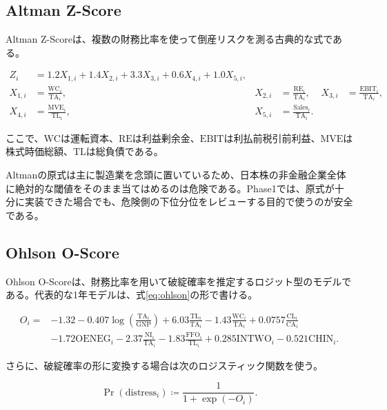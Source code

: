 \documentclass[11pt,a4paper]{article}
\newcommand{\NI}{\mathrm{NI}}
\newcommand{\TA}{\mathrm{TA}}
\newcommand{\TL}{\mathrm{TL}}
\newcommand{\WC}{\mathrm{WC}}
\newcommand{\RE}{\mathrm{RE}}
\newcommand{\MVE}{\mathrm{MVE}}
\begin{document}
\subsection{Altman Z-Score}

Altman Z-Scoreは、複数の財務比率を使って倒産リスクを測る古典的な式である。

\begin{align}
Z_i &= 1.2X_{1,i}+1.4X_{2,i}+3.3X_{3,i}+0.6X_{4,i}+1.0X_{5,i},
\label{eq:altman}\\
X_{1,i} &= \frac{\WC_i}{\TA_i},
& X_{2,i} &= \frac{\RE_i}{\TA_i},
& X_{3,i} &= \frac{\mathrm{EBIT}_i}{\TA_i},\nonumber\\
X_{4,i} &= \frac{\MVE_i}{\TL_i},
& X_{5,i} &= \frac{\mathrm{Sales}_i}{\TA_i}.\nonumber
\end{align}

ここで、$\WC$は運転資本、$\RE$は利益剰余金、$\mathrm{EBIT}$は利払前税引前利益、$\MVE$は株式時価総額、$\TL$は総負債である。

\begin{warnbox}[日本株への適用注意]
Altmanの原式は主に製造業を念頭に置いているため、日本株の非金融企業全体に絶対的な閾値をそのまま当てはめるのは危険である。Phase1では、原式が十分に実装できた場合でも、危険側の下位分位をレビューする目的で使うのが安全である。
\end{warnbox}

\subsection{Ohlson O-Score}

Ohlson O-Scoreは、財務比率を用いて破綻確率を推定するロジット型のモデルである。代表的な1年モデルは、式\eqref{eq:ohlson}の形で書ける。

\begin{align}
O_i ={}& -1.32 -0.407\log\!\left(\frac{\TA_i}{\mathrm{GNP}}\right)
+6.03\frac{\TL_i}{\TA_i}
-1.43\frac{\WC_i}{\TA_i}
+0.0757\frac{\mathrm{CL}_i}{\mathrm{CA}_i}
\nonumber\\
&-1.72\mathrm{OENEG}_i
-2.37\frac{\NI_i}{\TA_i}
-1.83\frac{\mathrm{FFO}_i}{\TL_i}
+0.285\mathrm{INTWO}_i
-0.521\mathrm{CHIN}_i.
\label{eq:ohlson}
\end{align}

さらに、破綻確率の形に変換する場合は次のロジスティック関数を使う。

\begin{equation}
\Pr(\mathrm{distress}_i) \coloneqq \frac{1}{1+\exp(-O_i)}.
\label{eq:ohlson-prob}
\end{equation}
\end{document}
